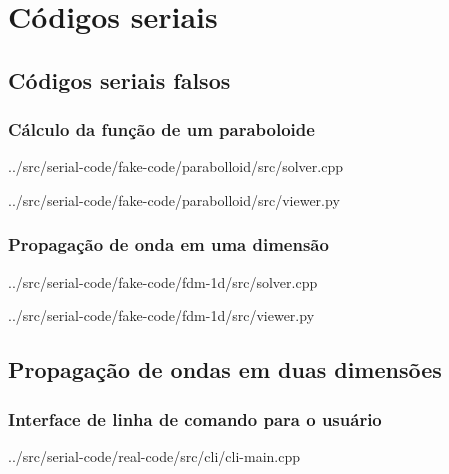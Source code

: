 \appendix

\chapter{Códigos seriais}

\section{Códigos seriais falsos}
	\subsection{Cálculo da função de um paraboloide}
	     
	     {../src/serial-code/fake-code/parabolloid/src/solver.cpp}
	     
	     
	     {../src/serial-code/fake-code/parabolloid/src/viewer.py}
	
	\subsection{Propagação de onda em uma dimensão}
	     
	     {../src/serial-code/fake-code/fdm-1d/src/solver.cpp}
	     
	     
	     {../src/serial-code/fake-code/fdm-1d/src/viewer.py}

\section{Propagação de ondas em duas dimensões}
	\subsection{Interface de linha de comando para o usuário}
	     
	     {../src/serial-code/real-code/src/cli/cli-main.cpp}

